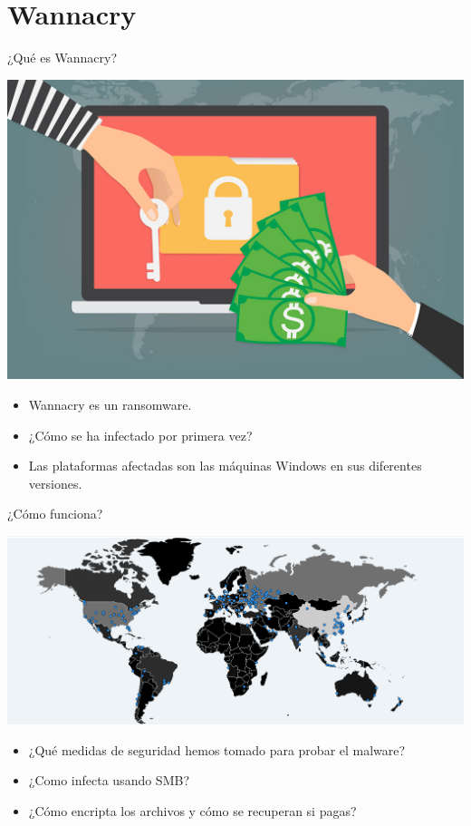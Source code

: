\documentclass[10pt]{beamer}
\begin{document}
\section{Wannacry}

\begin{frame}{¿Qué es Wannacry?}
	\pause
	\begin{center}
		\includegraphics[scale=0.15]{./Imagenes/wannacry-1.jpg}
	\end{center}
	\pause
	\begin{itemize}
		\item Wannacry es un ransomware.
		\pause
		\item ¿Cómo se ha infectado por primera vez?
		\pause
		\item Las plataformas afectadas son las máquinas Windows en sus diferentes versiones.
	\end{itemize}
\end{frame}

\begin{frame}{¿Cómo funciona?}
	\pause
	\begin{center}
		\includegraphics[scale=0.15]{./Imagenes/wannacry-2.png}
	\end{center}
	\pause
	\begin{itemize}
		\item ¿Qué medidas de seguridad hemos tomado para probar el malware?
		\pause
		\item ¿Como infecta usando SMB?
		\pause
		\item ¿Cómo encripta los archivos y cómo se recuperan si pagas?
	\end{itemize}
\end{frame}
\end{document}
